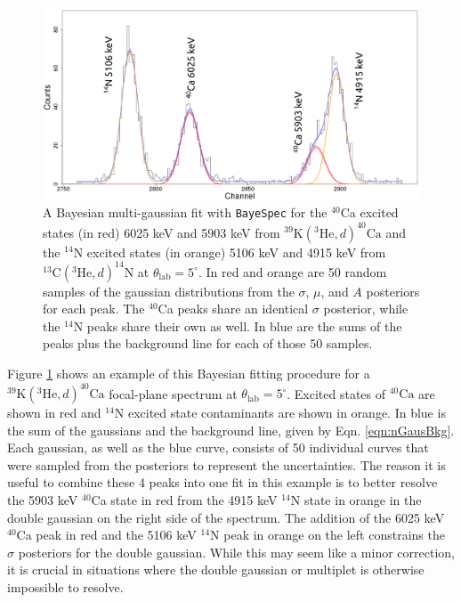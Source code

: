 \begin{figure}[t]
\centering
\includegraphics[width=6.5in]{Chapter-6/figs/Gaus_Bayesian.png}
\caption{\label{fig:Gaus_Bayesian}A Bayesian multi-gaussian fit with \texttt{BayeSpec} for the $^{40}$Ca excited states (in red) 6025 keV and 5903 keV from $^{39}\mathrm{K}(^{3}\mathrm{He},d)^{40}\mathrm{Ca}$ and the $^{14}$N excited states (in orange) 5106 keV and 4915 keV from $^{13}\mathrm{C}(^{3}\mathrm{He},d)^{14}\mathrm{N}$ at $\theta_{\mathrm{lab}} = 5^{\circ}$. In red and orange are 50 random samples of the gaussian distributions from the $\sigma$, $\mu$, and $A$ posteriors for each peak. The $^{40}$Ca peaks share an identical $\sigma$ posterior, while the $^{14}$N peaks share their own as well. In blue are the sums of the peaks plus the background line for each of those 50 samples.}
\end{figure}

Figure \ref{fig:Gaus_Bayesian} shows an example of this Bayesian fitting procedure for a $^{39}\mathrm{K}(^{3}\mathrm{He},d)^{40}\mathrm{Ca}$ focal-plane spectrum at $\theta_{\mathrm{lab}} = 5^{\circ}$. Excited states of $^{40}\mathrm{Ca}$ are shown in red and $^{14}\mathrm{N}$ excited state contaminants are shown in orange. In blue is the sum of the gaussians and the background line, given by Eqn. \ref{eqn:nGausBkg}. Each gaussian, as well as the blue curve, consists of 50 individual curves that were sampled from the posteriors to represent the uncertainties. The reason it is useful to combine these 4 peaks into one fit in this example is to better resolve the 5903 keV $^{40}$Ca state in red from the 4915 keV $^{14}$N state in orange in the double gaussian on the right side of the spectrum. The addition of the 6025 keV $^{40}$Ca peak in red and the 5106 keV $^{14}$N peak in orange on the left constrains the $\sigma$ posteriors for the double gaussian. While this may seem like a minor correction, it is crucial in situations where the double gaussian or multiplet is otherwise impossible to resolve.

